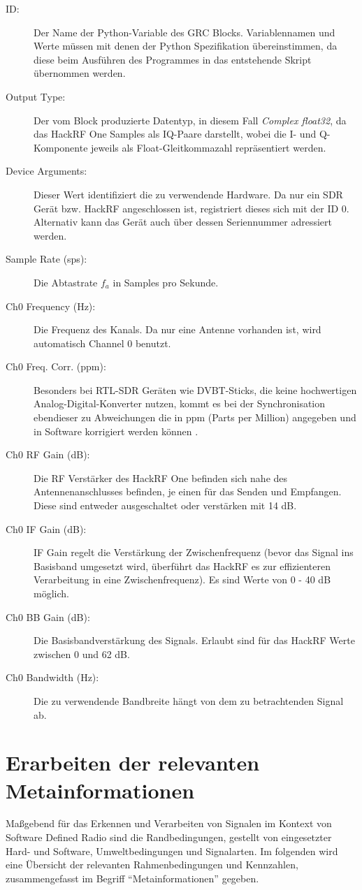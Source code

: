 \begin{description}
	\item[ID:] Der Name der Python-Variable des GRC Blocks. Variablennamen und Werte müssen mit denen der Python Spezifikation übereinstimmen, da diese beim Ausführen des Programmes in das entstehende Skript übernommen werden.
	\item[Output Type:] Der vom Block produzierte Datentyp, in diesem Fall \textit{Complex float32}, da das HackRF One Samples als IQ-Paare darstellt, wobei die I- und Q-Komponente jeweils als Float-Gleitkommazahl repräsentiert werden.
	\item[Device Arguments:] Dieser Wert identifiziert die zu verwendende Hardware. Da nur ein SDR Gerät bzw. HackRF angeschlossen ist, registriert dieses sich mit der ID 0. Alternativ kann das Gerät auch über dessen Seriennummer adressiert werden.
	\item [Sample Rate (sps):] Die Abtastrate $f_a$ in Samples pro Sekunde.
	\item[Ch0 Frequency (Hz):] Die Frequenz des Kanals. Da nur eine Antenne vorhanden ist, wird automatisch Channel 0 benutzt.
	\item[Ch0 Freq. Corr. (ppm):] Besonders bei RTL-SDR Geräten wie DVBT-Sticks, die keine hochwertigen Analog-Digital-Konverter nutzen, kommt es bei der Synchronisation ebendieser zu Abweichungen die in ppm (Parts per Million) angegeben und in Software korrigiert werden können \cite[vgl. Whiting, e. a., S.1]{ppm}.
	\item[Ch0 RF Gain (dB):] Die \ac{RF} Verstärker des HackRF One befinden sich nahe des Antennenanschlusses befinden, je einen für das Senden und Empfangen. Diese sind entweder ausgeschaltet oder verstärken mit 14 dB.
	\item[Ch0 IF Gain (dB):] \ac{IF} Gain regelt die Verstärkung der Zwischenfrequenz (bevor das Signal ins Basisband umgesetzt wird, überführt das HackRF es zur effizienteren Verarbeitung in eine Zwischenfrequenz). Es sind Werte von 0 - 40 dB möglich.
	\item[Ch0 BB Gain (dB):] Die Basisbandverstärkung des Signals. Erlaubt sind für das HackRF Werte zwischen 0 und 62 dB.
	\item[Ch0 Bandwidth (Hz):] Die zu verwendende Bandbreite hängt von dem zu betrachtenden Signal ab. 
\end{description}






\section{Erarbeiten der relevanten Metainformationen}
Maßgebend für das Erkennen und Verarbeiten von Signalen im Kontext von Software Defined Radio sind die Randbedingungen, gestellt von eingesetzter Hard- und Software, Umweltbedingungen und Signalarten.
Im folgenden wird eine Übersicht der relevanten Rahmenbedingungen und Kennzahlen, zusammengefasst im Begriff \enquote{Metainformationen} gegeben.

